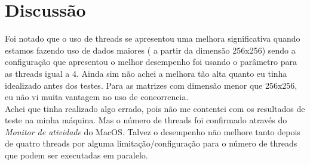 \section{Discussão}
Foi notado que o uso de threads se apresentou uma melhora significativa quando estamos fazendo uso de dados maiores ( a partir da dimensão 256x256) sendo a configuração que apresentou o melhor desempenho foi usando o parâmetro para as threads igual a 4.  Ainda sim não achei a melhora tão alta quanto eu tinha idealizado antes dos testes. Para as matrizes com dimensão menor que 256x256, eu não vi muita vantagem no uso de concorrencia. \\
Achei que tinha realizado algo errado, pois não me contentei com os resultados de teste na minha máquina. Mas o número de threads foi confirmado através do \textit{Monitor de atividade} do MacOS. Talvez o desempenho não melhore tanto depois de quatro threads por alguma limitação/configuração para o número de threads que podem ser executadas em paralelo. \\
